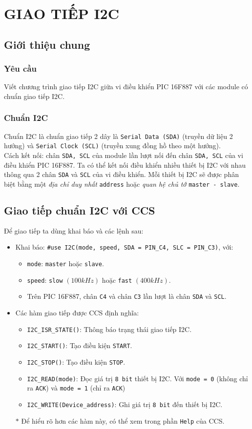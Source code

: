 \chapter{GIAO TIẾP I2C}
\section{Giới thiệu chung}
\subsection{Yêu cầu}Viết chương trình giao tiếp I2C giữa vi điều khiển PIC 16F887 với các module có chuẩn giao tiếp I2C.
\subsection{Chuẩn I2C}
Chuẩn I2C là chuẩn giao tiếp 2 dây là \verb|Serial Data (SDA)| (truyền dữ liệu 2 hướng) và \verb|Serial Clock (SCL)| (truyền xung đồng hồ theo một hướng).\\

Cách kết nối: chân \verb|SDA, SCL| của module lần lượt nối đến chân \verb|SDA, SCL| của vi điều khiển PIC 16F887. Ta có thể kết nối điều khiển nhiều thiết bị I2C với nhau thông qua 2 chân \verb|SDA| và \verb|SCL| của vi điều khiển. Mỗi thiết bị I2C sẽ được phân biệt bằng một \emph{địa chỉ duy nhất} \verb|address| hoặc \emph{quan hệ chủ tớ} \verb|master - slave|.
\section{Giao tiếp chuẩn I2C với CCS}
Để giao tiếp ta dùng khai báo và các lệnh sau:
\begin{itemize}
\item Khai báo: \verb|#use I2C(mode, speed, SDA = PIN_C4, SLC = PIN_C3)|, với:
\begin{itemize}
\item \verb|mode|: \verb|master| hoặc \verb|slave|.
\item \verb|speed|: \verb|slow| $\left({100kHz}\right)$ hoặc \verb|fast| $\left({400kHz}\right)$.
\item Trên PIC 16F887, chân \verb|C4| và chân \verb|C3| lần lượt là chân \verb|SDA| và \verb|SCL|.
\end{itemize}
\item Các hàm giao tiếp được CCS định nghĩa:
\begin{itemize}
\item \verb|I2C_ISR_STATE()|: Thông báo trạng thái giao tiếp I2C.
\item \verb|I2C_START()|: Tạo điều kiện \verb|START|.
\item \verb|I2C_STOP()|: Tạo điều kiện \verb|STOP|.
\item \verb|I2C_READ(mode)|: Đọc giá trị \verb|8 bit| thiết bị I2C. Với \verb|mode = 0| (không chỉ ra \verb|ACK|) và \verb|mode = 1| (chỉ ra \verb|ACK|)
\item \verb|I2C_WRITE(Device_address)|: Ghi giá trị \verb|8 bit| đến thiết bị I2C.
\end{itemize}
\item[$\ast$] Để hiểu rõ hơn các hàm này, có thể xem trong phần \verb|Help| của CCS.
\end{itemize}
